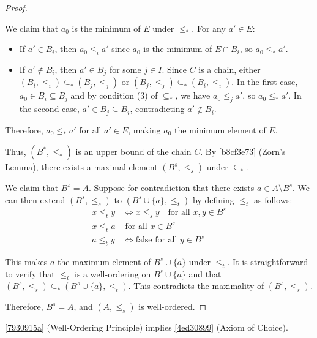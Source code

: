 \begin{proof}
\begin{enumerate}
        We claim that $a_0$ is the minimum of $E$ under $\le_*$. For any $a' \in E$:
        \begin{itemize}
            \item If $a' \in B_i$, then $a_0 \le_i a'$ since $a_0$ is the minimum of $E \cap B_i$, so $a_0 \le_* a'$.
            \item If $a' \notin B_i$, then $a' \in B_j$ for some $j \in I$. Since $C$ is a chain, either 
            $(B_i, \le_i) \subseteq_* (B_j, \le_j)$ or $(B_j, \le_j) \subseteq_* (B_i, \le_i)$. 
            In the first case, $a_0 \in B_i \subseteq B_j$ and by condition (3) of $\subseteq_*$, we have $a_0 \le_j a'$, 
            so $a_0 \le_* a'$. In the second case, $a' \in B_j \subseteq B_i$, contradicting $a' \notin B_i$.
        \end{itemize}
        
        Therefore, $a_0 \le_* a'$ for all $a' \in E$, making $a_0$ the minimum element of $E$.
    \end{enumerate}

    Thus, $(B^*, \le_*)$ is an upper bound of the chain $C$. By \cref{b8cf3e73} (Zorn's Lemma), 
    there exists a maximal element $(B^{s}, \le_{s})$ under $\subseteq_*$.

    We claim that $B^s = A$. Suppose for contradiction that there exists $a \in A \setminus B^s$. 
    We can then extend $(B^s, \le_s)$ to $(B^s \cup \{ a \}, \le_{t})$ by defining $\le_{t}$ as follows:
    \begin{align*}
        x \le_t y &\iff x \le_s y \quad \text{for all } x,y \in B^s \\
        x \le_t a &\text{ for all } x \in B^s \\
        a \le_t y &\iff \text{false for all } y \in B^s
    \end{align*}
    
    This makes $a$ the maximum element of $B^s \cup \{a\}$ under $\le_t$. It is straightforward to verify that 
    $\le_t$ is a well-ordering on $B^s \cup \{a\}$ and that $(B^s, \le_s) \subseteq_* (B^s \cup \{a\}, \le_t)$. 
    This contradicts the maximality of $(B^s, \le_s)$.
    
    Therefore, $B^s = A$, and $(A, \le_s)$ is well-ordered.

\end{proof}

\begin{thm}
    \cref{7930915a} (Well-Ordering Principle) implies \cref{4ed30899} (Axiom of Choice).
\end{thm}

